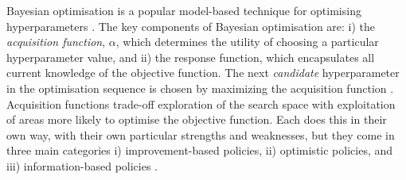 Bayesian optimisation is a popular model-based technique for optimising hyperparameters \cite{bergstraAlgorithmsHyperParameterOptimizationa,hutterSequentialModelbasedOptimization2011,NIPS2012_4522,bergstraMakingScienceModel2013,feurer2019hyperparameter}. The key components of Bayesian optimisation are: i) the \emph{acquisition function}, $\alpha$, which determines the utility of choosing a particular hyperparameter value, and ii) the response function, which encapsulates all current knowledge of the objective function.  The next \emph{candidate} hyperparameter in the optimisation sequence is chosen by maximizing the acquisition function \cite{shahriariTakingHumanOut2016}. Acquisition functions trade-off exploration of the search space with exploitation of areas more likely to optimise the objective function. Each does this in their own way, with their own particular strengths and weaknesses, but they come in three main categories i) improvement-based policies, ii) optimistic policies, and iii) information-based policies \cite{shahriariTakingHumanOut2016}.

